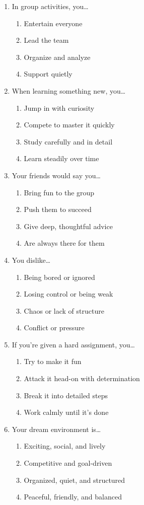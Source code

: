 \documentclass[12pt]{article}
\begin{document}
\begin{enumerate}[label=\textbf{Q\arabic*.}]
\item In group activities, you…
\begin{enumerate}[label=(\Alph*)]
\item Entertain everyone
\item Lead the team
\item Organize and analyze
\item Support quietly
\end{enumerate}

\item When learning something new, you…
\begin{enumerate}[label=(\Alph*)]
\item Jump in with curiosity
\item Compete to master it quickly
\item Study carefully and in detail
\item Learn steadily over time
\end{enumerate}

\item Your friends would say you…
\begin{enumerate}[label=(\Alph*)]
\item Bring fun to the group
\item Push them to succeed
\item Give deep, thoughtful advice
\item Are always there for them
\end{enumerate}

\item You dislike…
\begin{enumerate}[label=(\Alph*)]
\item Being bored or ignored
\item Losing control or being weak
\item Chaos or lack of structure
\item Conflict or pressure
\end{enumerate}

\item If you’re given a hard assignment, you…
\begin{enumerate}[label=(\Alph*)]
\item Try to make it fun
\item Attack it head-on with determination
\item Break it into detailed steps
\item Work calmly until it’s done
\end{enumerate}

\item Your dream environment is…
\begin{enumerate}[label=(\Alph*)]
\item Exciting, social, and lively
\item Competitive and goal-driven
\item Organized, quiet, and structured
\item Peaceful, friendly, and balanced
\end{enumerate}

\end{enumerate}
\end{document}
